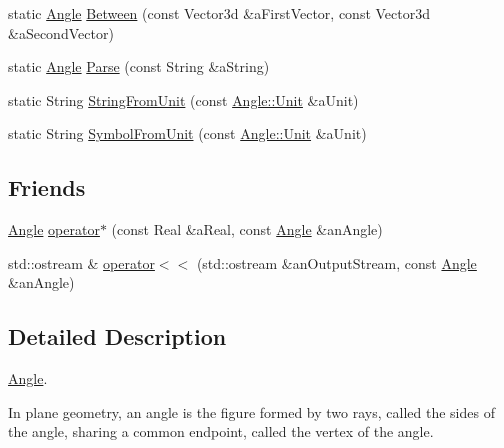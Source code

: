 \begin{DoxyCompactItemize}
\item 
static \hyperlink{classlibrary_1_1physics_1_1units_1_1_angle}{Angle} \hyperlink{classlibrary_1_1physics_1_1units_1_1_angle_ab7ce400fbca2bfd2ebe453e1685ad049}{Between} (const Vector3d \&a\+First\+Vector, const Vector3d \&a\+Second\+Vector)
\item 
static \hyperlink{classlibrary_1_1physics_1_1units_1_1_angle}{Angle} \hyperlink{classlibrary_1_1physics_1_1units_1_1_angle_a3d7a56d496018330d9529036a31be312}{Parse} (const String \&a\+String)
\item 
static String \hyperlink{classlibrary_1_1physics_1_1units_1_1_angle_a95d8f1d9e27062ca480b7c264a035283}{String\+From\+Unit} (const \hyperlink{classlibrary_1_1physics_1_1units_1_1_angle_a3c329d415a61783b16ce481874cc5956}{Angle\+::\+Unit} \&a\+Unit)
\item 
static String \hyperlink{classlibrary_1_1physics_1_1units_1_1_angle_a2f51939276e1d1c2121e1fc911e6ca30}{Symbol\+From\+Unit} (const \hyperlink{classlibrary_1_1physics_1_1units_1_1_angle_a3c329d415a61783b16ce481874cc5956}{Angle\+::\+Unit} \&a\+Unit)
\end{DoxyCompactItemize}
\subsection*{Friends}
\begin{DoxyCompactItemize}
\item 
\hyperlink{classlibrary_1_1physics_1_1units_1_1_angle}{Angle} \hyperlink{classlibrary_1_1physics_1_1units_1_1_angle_af699984b24759466957ecddaa7e61fc9}{operator$\ast$} (const Real \&a\+Real, const \hyperlink{classlibrary_1_1physics_1_1units_1_1_angle}{Angle} \&an\+Angle)
\item 
std\+::ostream \& \hyperlink{classlibrary_1_1physics_1_1units_1_1_angle_a0846b77ee3281e8a559197c3c3208eed}{operator$<$$<$} (std\+::ostream \&an\+Output\+Stream, const \hyperlink{classlibrary_1_1physics_1_1units_1_1_angle}{Angle} \&an\+Angle)
\end{DoxyCompactItemize}


\subsection{Detailed Description}
\hyperlink{classlibrary_1_1physics_1_1units_1_1_angle}{Angle}. 

In plane geometry, an angle is the figure formed by two rays, called the sides of the angle, sharing a common endpoint, called the vertex of the angle.

